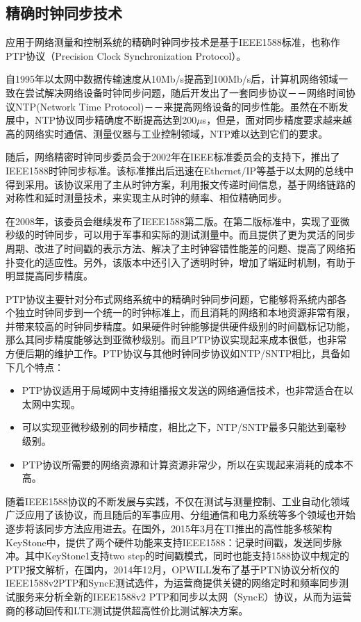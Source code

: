 \subsection{精确时钟同步技术}
应用于网络测量和控制系统的精确时钟同步技术是基于IEEE1588标准，也称作PTP协议（Precision Clock Synchronization Protocol）。

自1995年以太网中数据传输速度从10Mb/s提高到100Mb/s后，计算机网络领域一致在尝试解决网络设备时钟同步问题，随后开发出了一套同步协议－－网络时间协议NTP(Network Time Protocol)－－来提高网络设备的同步性能。虽然在不断发展中，NTP协议同步精确度不断提高达到200$\mu$s，但是，面对同步精度要求越来越高的网络实时通信、测量仪器与工业控制领域，NTP难以达到它们的要求。

随后，网络精密时钟同步委员会于2002年在IEEE标准委员会的支持下，推出了IEEE1588时钟同步标准。该标准推出后迅速在Ethernet/IP等基于以太网的总线中得到采用。该协议采用了主从时钟方案，利用报文传递时间信息，基于网络链路的对称性和延时测量技术，来实现主从时钟的频率、相位精确同步。

在2008年，该委员会继续发布了IEEE1588第二版。在第二版标准中，实现了亚微秒级的时钟同步，可以用于军事和实际的测试测量中。而且提供了更为灵活的同步周期、改进了时间戳的表示方法、解决了主时钟容错性能差的问题、提高了网络拓扑变化的适应性。另外，该版本中还引入了透明时钟，增加了端延时机制，有助于明显提高同步精度。

PTP协议主要针对分布式网络系统中的精确时钟同步问题，它能够将系统内部各个独立时钟同步到一个统一的时钟标准上，而且消耗的网络和本地资源非常有限，并带来较高的时钟同步精度。如果硬件时钟能够提供硬件级别的时间戳标记功能，那么其同步精度能够达到亚微秒级别。而且PTP协议实现起来成本很低，也非常方便后期的维护工作。PTP协议与其他时钟同步协议如NTP/SNTP相比，具备如下几个特点\supercite{4}：
\begin{itemize}[noitemsep,topsep=0pt,parsep=0pt,partopsep=0pt]
	\item PTP协议适用于局域网中支持组播报文发送的网络通信技术，也非常适合在以太网中实现。
	\item 可以实现亚微秒级别的同步精度，相比之下，NTP/SNTP最多只能达到毫秒级别。
	\item PTP协议所需要的网络资源和计算资源非常少，所以在实现起来消耗的成本不高。
\end{itemize}

随着IEEE1588协议的不断发展与实践，不仅在测试与测量控制、工业自动化领域广泛应用了该协议，而且随后的军事应用、分组通信和电力系统等多个领域也开始逐步将该同步方法应用进去。在国外，2015年3月在TI推出的高性能多核架构KeyStone中\supercite{5}，提供了两个硬件功能来支持IEEE1588：记录时间戳，发送同步脉冲。其中KeyStone1支持two step的时间戳模式，同时也能支持1588协议中规定的PTP报文解析，在国内，2014年12月，OPWILL发布了基于PTN协议分析仪的IEEE1588v2PTP和SyncE测试选件，为运营商提供关键的网络定时和频率同步测试服务来分析全新的IEEE1588v2 PTP和同步以太网（SyncE）协议，从而为运营商的移动回传和LTE测试提供超高性价比测试解决方案。

